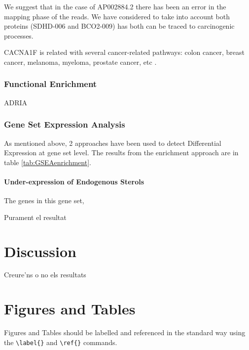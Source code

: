 \documentclass[9pt,twocolumn,twoside]{gsajnl}
\begin{document}
We suggest that in the case of AP002884.2 there has been an error in the mapping phase of the reads. We have considered to take into account both proteins (SDHD-006 and BCO2-009) has both can be traced to carcinogenic processes.

CACNA1F is related with several cancer-related pathways: colon cancer, breast cancer, melanoma, myeloma, prostate cancer, etc \cite{tcng}.

\subsubsection*{Functional Enrichment}
ADRIA
\subsubsection*{Gene Set Expression Analysis}

As mentioned above, 2 approaches have been used to detect Differential Expression at gene set level. The results from the enrichment approach are in table \ref{tab:GSEAenrichment}. 

\paragraph{Under-expression of Endogenous Sterols } The genes in this gene set,


Purament el resultat


\section*{Discussion}

Creure'ns o no els resultats

\section*{Figures and Tables}

Figures and Tables should be labelled and referenced in the standard way using the \verb|\label{}| and \verb|\ref{}| commands.
\end{document}
